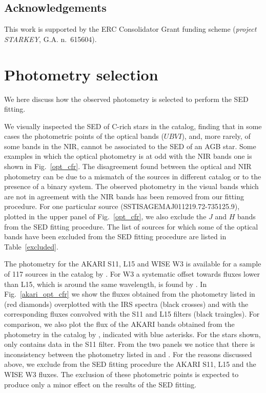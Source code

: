\documentclass[useAMS,usenatbib]{mn2e/mn2e}
\begin{document}
{\subsection*{Acknowledgements}
This work is supported by the ERC Consolidator Grant funding scheme
({\em project STARKEY}, G.A. n.~615604).




\appendix
\section{Photometry selection}
We here discuss how the observed photometry is selected to perform the SED fitting.

We visually inspected the SED of C-rich stars in the catalog, finding that in some cases the photometric points of the optical bands ($UBVI$), and, more rarely, of some bands in the NIR, cannot be associated to the SED of an AGB star.
Some examples in which the optical photometry is at odd with the NIR bands one is shown in Fig.~\ref{opt_cfr}. The disagreement found between the optical and NIR photometry can be due to a mismatch of the sources in different catalog or to the presence of a binary system. 
The observed photometry in the visual bands which are not in agreement with the NIR bands has been removed from our fitting procedure. 
For one particular source (SSTISAGEMAJ011219.72-735125.9), plotted in the upper panel of Fig.~\ref{opt_cfr}, we also exclude the $J$ and $H$ bands from the SED fitting procedure.
The list of sources for which some of the optical bands have been excluded from the SED fitting procedure are listed in Table~\ref{excluded}.

The photometry for the AKARI S11, L15 and WISE W3 is available for a sample of 117 sources in the catalog by \citet{Srinivasan16}.
For W3 a systematic offset towards fluxes lower than L15, which is around the same wavelength, is found by \citet{Srinivasan16}.
In Fig.~\ref{akari_opt_cfr} we show the fluxes obtained from the photometry listed in \citet{Srinivasan16} (red diamonds) overplotted with the IRS spectra (black crosses) and with the corresponding fluxes convolved with the S11 and L15 filters (black traingles).
For comparison, we also plot the flux of the AKARI bands obtained from the photometry in the catalog by \citet{Ita10}, indicated with blue asterisks. For the stars shown, \citet{Ita10} only contains data in the S11 filter.
From the two panels we notice that there is inconsistency between the photometry listed in \citet{Srinivasan16} and \citet{Ita10}. For the reasons discussed above, we exclude from the SED fitting procedure the AKARI S11, L15 and the WISE W3 fluxes. The exclusion of these photometric points is expected to produce only a minor effect on the results of the SED fitting.

}
\end{document}
